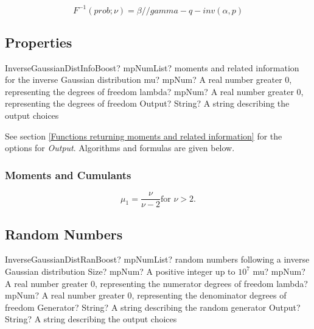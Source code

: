 \begin{equation} 
	F^{-1}(prob;\nu)= \beta / / gamma-q-inv(\alpha, p)
\end{equation}



\subsection{Properties}
\label{InverseGaussianDistributionProperties}

\begin{mpFunctionsExtract}
	\mpFunctionThreeNotImplemented
	{InverseGaussianDistInfoBoost? mpNumList? moments and related information for the inverse Gaussian distribution}
	{mu? mpNum? A real number greater 0, representing the degrees of freedom}
	{lambda? mpNum? A real number greater 0, representing the degrees of freedom}
	{Output? String? A string describing the output choices}
\end{mpFunctionsExtract}

\vspace{0.3cm}

See section \ref{Functions returning moments and related information} for the options for {\itshape\sffamily Output}. Algorithms and formulas are given below.

\subsubsection{Moments and Cumulants}
\begin{equation} 
	\mu_1 = \frac{\nu}{\nu-2} \text{for } \nu>2.
\end{equation}





\subsection{Random Numbers}

\begin{mpFunctionsExtract}
	\mpFunctionFiveNotImplemented
	{InverseGaussianDistRanBoost? mpNumList? random numbers following a inverse Gaussian distribution}
	{Size? mpNum? A positive integer up to $10^7$}
	{mu? mpNum? A real number greater 0, representing the numerator  degrees of freedom}
	{lambda? mpNum? A real number greater 0, representing the denominator degrees of freedom}
	{Generator? String? A string describing the random generator}
	{Output? String? A string describing the output choices}
\end{mpFunctionsExtract}

